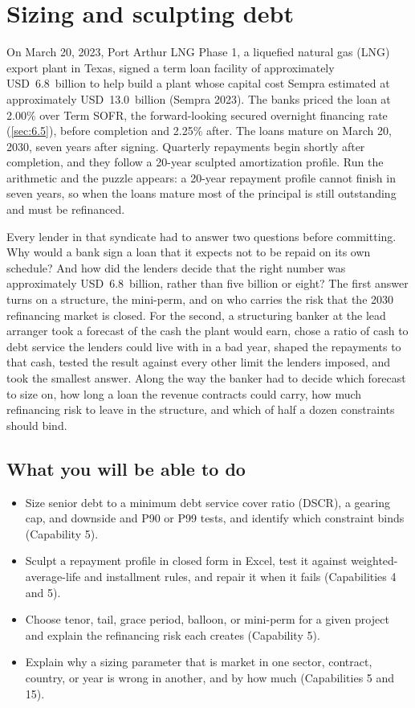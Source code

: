 \chapter{Sizing and sculpting debt}\label{ch:36}

On March 20, 2023, Port Arthur LNG Phase 1, a liquefied natural gas (LNG) export plant in Texas, signed a term loan facility of approximately USD~6.8~billion to help build a plant whose capital cost Sempra estimated at approximately USD~13.0~billion (Sempra 2023). The banks priced the loan at 2.00\% over Term SOFR, the forward-looking secured overnight financing rate (\cref{sec:6.5}), before completion and 2.25\% after. The loans mature on March 20, 2030, seven years after signing. Quarterly repayments begin shortly after completion, and they follow a 20-year sculpted amortization profile. Run the arithmetic and the puzzle appears: a 20-year repayment profile cannot finish in seven years, so when the loans mature most of the principal is still outstanding and must be refinanced.

Every lender in that syndicate had to answer two questions before committing. Why would a bank sign a loan that it expects not to be repaid on its own schedule? And how did the lenders decide that the right number was approximately USD~6.8~billion, rather than five billion or eight? The first answer turns on a structure, the mini-perm, and on who carries the risk that the 2030 refinancing market is closed. For the second, a structuring banker at the lead arranger took a forecast of the cash the plant would earn, chose a ratio of cash to debt service the lenders could live with in a bad year, shaped the repayments to that cash, tested the result against every other limit the lenders imposed, and took the smallest answer. Along the way the banker had to decide which forecast to size on, how long a loan the revenue contracts could carry, how much refinancing risk to leave in the structure, and which of half a dozen constraints should bind.

\section*{What you will be able to do}
\begin{itemize}
  \item Size senior debt to a minimum debt service cover ratio (DSCR), a gearing cap, and downside and P90 or P99 tests, and identify which constraint binds (Capability 5).
  \item Sculpt a repayment profile in closed form in Excel, test it against weighted-average-life and installment rules, and repair it when it fails (Capabilities 4 and 5).
  \item Choose tenor, tail, grace period, balloon, or mini-perm for a given project and explain the refinancing risk each creates (Capability 5).
  \item Explain why a sizing parameter that is market in one sector, contract, country, or year is wrong in another, and by how much (Capabilities 5 and 15).
\end{itemize}

